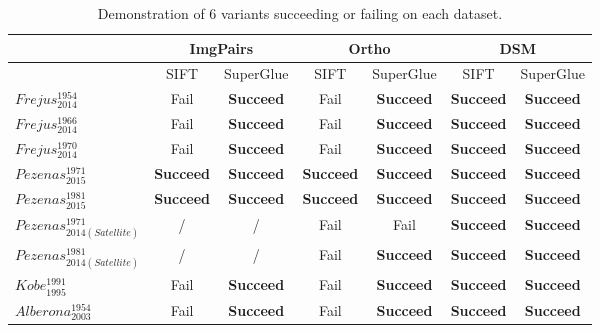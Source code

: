 \begin{table}[htbp]
	\scriptsize %
	\centering
	\begin{tabular}{||l|c|c|c|c|c|c||}\hline
		&\multicolumn{2}{c|}{ImgPairs} &\multicolumn{2}{c|}{Ortho} &\multicolumn{2}{c|}{DSM}\\\hline
		& SIFT & SuperGlue & SIFT & SuperGlue & SIFT & SuperGlue \\\hline\hline
		$Frejus_{2014}^{1954}$ &  Fail  &  \textbf{Succeed}  &  Fail  &  \textbf{Succeed}  &  \textbf{Succeed}  &  \textbf{Succeed} \\
		$Frejus_{2014}^{1966}$ &  Fail  &  \textbf{Succeed}  &  Fail  &  \textbf{Succeed}  &  \textbf{Succeed}  &  \textbf{Succeed} \\
		$Frejus_{2014}^{1970}$ &  Fail  &  \textbf{Succeed}  &  Fail  &  \textbf{Succeed}  &  \textbf{Succeed}  &  \textbf{Succeed} \\\hline
		$Pezenas_{2015}^{1971}$ &  \textbf{Succeed}  &  \textbf{Succeed}  &  \textbf{Succeed}  &  \textbf{Succeed}  &  \textbf{Succeed}  &  \textbf{Succeed} \\
		$Pezenas_{2015}^{1981}$ &  \textbf{Succeed}  &  \textbf{Succeed}  &  \textbf{Succeed}  &  \textbf{Succeed}  &  \textbf{Succeed}  &  \textbf{Succeed} \\\hline
		$Pezenas_{2014(Satellite)}^{1971}$ & / & / &  Fail  &  Fail  &  \textbf{Succeed}  &  \textbf{Succeed} \\
		$Pezenas_{2014(Satellite)}^{1981}$ & / & / &  Fail  &  \textbf{Succeed}  &  \textbf{Succeed}  &  \textbf{Succeed} \\\hline
		$Kobe_{1995}^{1991}$ &  Fail  &  \textbf{Succeed}  &  Fail  &  \textbf{Succeed}  &  \textbf{Succeed}  &  \textbf{Succeed} \\\hline
		$Alberona_{2003}^{1954}$ &  Fail  &  \textbf{Succeed}  &  Fail  &  \textbf{Succeed}  &  \textbf{Succeed}  &  \textbf{Succeed} \\\hline
	\end{tabular}
	\caption{Demonstration of 6 variants succeeding or failing on each dataset.}
	\label{succeedorfail}
\end{table}


